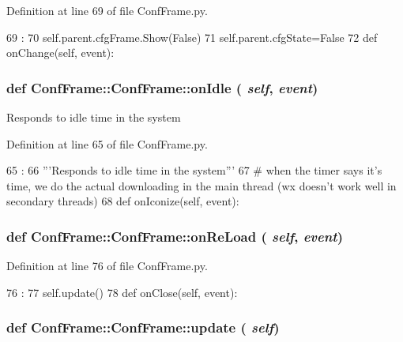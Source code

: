 Definition at line 69 of file ConfFrame.py.


\begin{DoxyCode}
69                               :
70         self.parent.cfgFrame.Show(False)
71         self.parent.cfgState=False
72 
    def onChange(self, event):
\end{DoxyCode}
\hypertarget{classConfFrame_1_1ConfFrame_abcad6b85b23eb0a965ba4befc63f0631}{
\subsubsection[{onIdle}]{\setlength{\rightskip}{0pt plus 5cm}def ConfFrame::ConfFrame::onIdle ( {\em self}, \/   {\em event})}}
\label{classConfFrame_1_1ConfFrame_abcad6b85b23eb0a965ba4befc63f0631}
\begin{DoxyVerb}Responds to idle time in the system\end{DoxyVerb}
 

Definition at line 65 of file ConfFrame.py.


\begin{DoxyCode}
65                            :
66         '''Responds to idle time in the system'''
67         # when the timer says it's time, we do the actual downloading in the main
       thread (wx doesn't work well in secondary threads)
68 
    def onIconize(self, event):
\end{DoxyCode}
\hypertarget{classConfFrame_1_1ConfFrame_aabe3ae34e563a3bfc351988b08754831}{
\subsubsection[{onReLoad}]{\setlength{\rightskip}{0pt plus 5cm}def ConfFrame::ConfFrame::onReLoad ( {\em self}, \/   {\em event})}}
\label{classConfFrame_1_1ConfFrame_aabe3ae34e563a3bfc351988b08754831}


Definition at line 76 of file ConfFrame.py.


\begin{DoxyCode}
76                              :
77         self.update()
78 
    def onClose(self, event):
\end{DoxyCode}
\hypertarget{classConfFrame_1_1ConfFrame_a8bb0ee21547d813d31a240c4cb74c69d}{
\subsubsection[{update}]{\setlength{\rightskip}{0pt plus 5cm}def ConfFrame::ConfFrame::update ( {\em self})}}
\label{classConfFrame_1_1ConfFrame_a8bb0ee21547d813d31a240c4cb74c69d}


